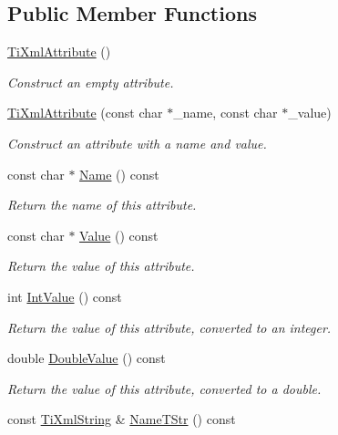 \subsection*{Public Member Functions}
\begin{DoxyCompactItemize}
\item 
\hyperlink{class_ti_xml_attribute_a9cfa3c8179873fd485d83003b114f8e1}{TiXmlAttribute} ()
\begin{DoxyCompactList}\small\item\em Construct an empty attribute. \end{DoxyCompactList}\item 
\hyperlink{class_ti_xml_attribute_a759d0b76fb8fcf765ecab243bc14f05e}{TiXmlAttribute} (const char $\ast$\_\-name, const char $\ast$\_\-value)
\begin{DoxyCompactList}\small\item\em Construct an attribute with a name and value. \end{DoxyCompactList}\item 
const char $\ast$ \hyperlink{class_ti_xml_attribute_a298a57287d305904ba6bd96ae6f78d3d}{Name} () const 
\begin{DoxyCompactList}\small\item\em Return the name of this attribute. \end{DoxyCompactList}\item 
const char $\ast$ \hyperlink{class_ti_xml_attribute_a0f874490eac8ca00ee0070765d0e97e3}{Value} () const 
\begin{DoxyCompactList}\small\item\em Return the value of this attribute. \end{DoxyCompactList}\item 
int \hyperlink{class_ti_xml_attribute_aa1a20ad59dc7e89a0ab265396360d50f}{IntValue} () const 
\begin{DoxyCompactList}\small\item\em Return the value of this attribute, converted to an integer. \end{DoxyCompactList}\item 
double \hyperlink{class_ti_xml_attribute_a2880ddef53fc7522c99535273954d230}{DoubleValue} () const 
\begin{DoxyCompactList}\small\item\em Return the value of this attribute, converted to a double. \end{DoxyCompactList}\item 
const \hyperlink{class_ti_xml_string}{TiXmlString} \& \hyperlink{class_ti_xml_attribute_a910541c3538b7be14721a1dd032823fe}{NameTStr} () const 

\end{DoxyCompactItemize}
